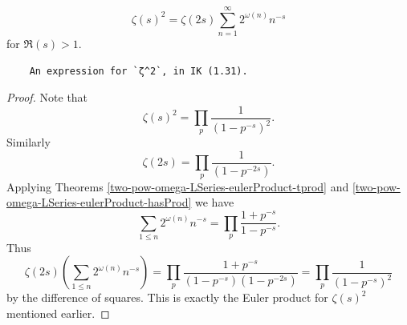 \begin{theorem}
\label{zeta_pow_two}
\leanok
$$\zeta(s)^2 =\zeta(2s) \sum_{n=1}^{\infty} 2^{\omega(n)} n^{-s}$$ for $\Re(s) > 1$.
  \begin{verbatim}
    An expression for `ζ^2`, in IK (1.31).
  \end{verbatim}
\end{theorem}
\begin{proof}
\leanok
Note that
    $$\zeta(s)^2=\prod_p\frac{1}{(1-p^{-s})^2}.$$
    Similarly
    $$\zeta(2s)=\prod_p\frac{1}{(1-p^{-2s})}.$$
    Applying Theorems \ref{two-pow-omega-LSeries-eulerProduct-tprod} and \ref{two-pow-omega-LSeries-eulerProduct-hasProd} we have
    $$\sum_{1\leq n}2^{\omega(n)}n^{-s}=\prod_p\frac{1+p^{-s}}{1-p^{-s}}.$$
    Thus
    $$\zeta(2s)\left(\sum_{1\leq n}2^{\omega(n)}n^{-s}\right)=\prod_p\frac{1+p^{-s}}{(1-p^{-s})(1-p^{-2s})}=\prod_p\frac{1}{(1-p^{-s})^2}$$
    by the difference of squares. This is exactly the Euler product for $\zeta(s)^2$ mentioned earlier.
\end{proof}
